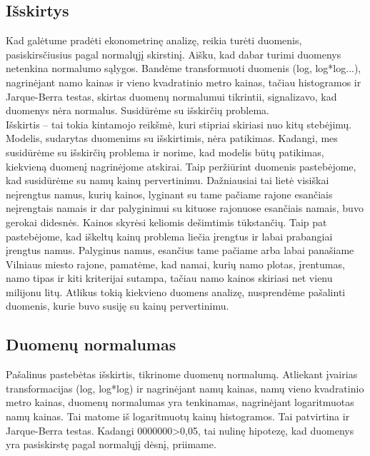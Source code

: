 \documentclass[a4paper]{article}
\begin{document}
\subsection{Išskirtys}
\hspace*{0,52cm}Kad galėtume pradėti ekonometrinę analizę, reikia turėti duomenis, pasiskirsčiusius pagal normalųjį skirstinį. Aišku, kad dabar turimi duomenys netenkina normalumo sąlygos. Bandėme transformuoti duomenis (log, log*log...), nagrinėjant namo kainas ir vieno kvadratinio metro kainas, tačiau histogramos ir Jarque-Berra testas, skirtas duomenų normalumui tikrintii, signalizavo, kad duomenys nėra normalus. Susidūrėme su išskirčių problema.\\
\hspace*{0,52cm}Išskirtis -- tai tokia kintamojo reikšmė, kuri stipriai skiriasi nuo kitų stebėjimų. Modelis, sudarytas duomenims su išskirtimis, nėra patikimas. Kadangi, mes susidūrėme su išskirčių problema ir norime, kad modelis būtų patikimas, kiekvieną duomenį nagrinėjome atskirai. Taip peržiūrint duomenis pastebėjome, kad susidūrėme su namų kainų pervertinimu. Dažniausiai tai lietė visiškai neįrengtus namus, kurių kainos, lyginant su tame pačiame rajone esančiais neįrengtais namais ir dar palyginimui su kituose rajonuose esančiais namais, buvo gerokai didesnės. Kainos skyrėsi keliomis dešimtimis tūkstančių. Taip pat pastebėjome, kad iškeltų kainų problema liečia įrengtus ir labai prabangiai įrengtus namus. Palyginus namus, esančius tame pačiame arba labai panašiame Vilniaus miesto rajone, pamatėme, kad namai, kurių namo plotas, įrentumas, namo tipas ir kiti kriterijai sutampa, tačiau namo kainos skiriasi net vienu milijonu litų. Atlikus tokią kiekvieno duomens analizę, nusprendėme pašalinti duomenis, kurie buvo susiję su kainų pervertinimu.

\subsection{Duomenų normalumas}
\hspace*{0,52cm}Pašalinus pastebėtas išskirtis, tikrinome duomenų normalumą. Atliekant įvairias transformacijas (log, log*log) ir nagrinėjant namų kainas, namų vieno kvadratinio metro kainas, duomenų normalumas yra tenkinamas, nagrinėjant logaritmuotas namų kainas. Tai matome iš logaritmuotų kainų histogramos. Tai patvirtina ir Jarque-Berra testas. Kadangi 0000000>0,05, tai nulinę hipotezę, kad duomenys yra pasiskirstę pagal normalųjį dėsnį, priimame.
\end{document}
